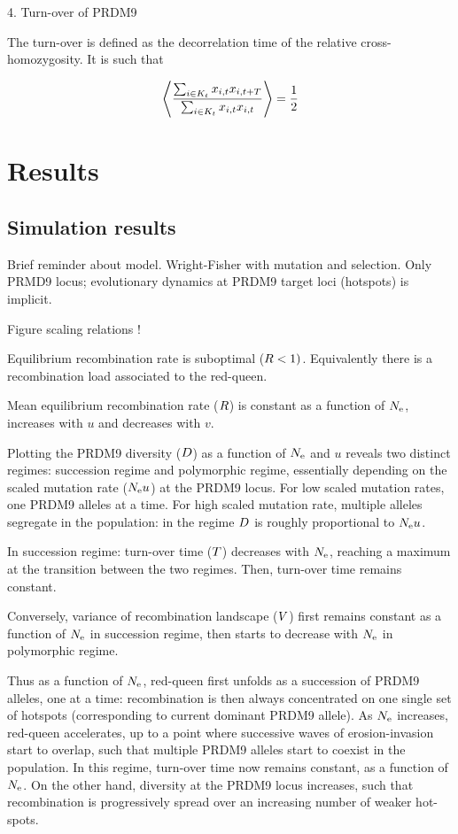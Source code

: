 \documentclass{article}
\begin{document}
4. Turn-over of PRDM9

The turn-over is defined as the decorrelation time of the relative cross-homozygosity.
It is such that 

\begin{align}
    \left< \dfrac{\sum_{i \in K_{t}} x_{i,t} x_{i,t+T}}{\sum_{i \in K_{t}} x_{i,t} x_{i,t}}   \right>  =  \dfrac{1}{2}
\end{align}

\section*{Results}
\subsection*{Simulation results} 

Brief reminder about model. Wright-Fisher with mutation and selection. Only PRMD9 locus; evolutionary dynamics at PRDM9 target loci (hotspots) is implicit.

Figure scaling relations !

Equilibrium recombination rate is suboptimal ($R < 1)$. Equivalently there is a recombination load associated to the red-queen.

Mean equilibrium recombination rate ($R$) is constant as a function of $N_\mathrm{e}$, increases with $u$ and decreases with $v$.

Plotting the PRDM9 diversity ($D$) as a function of $N_\mathrm{e}$ and $u$ reveals two distinct regimes: succession regime and polymorphic regime, essentially depending on the scaled mutation rate ($N_\mathrm{e} u$) at the PRDM9 locus. For low scaled mutation rates, one PRDM9 alleles at a time. For high scaled mutation rate, multiple alleles segregate in the population: in the regime $D$ is roughly proportional to $N_\mathrm{e} u$.

In succession regime: turn-over time ($T$) decreases with $N_\mathrm{e}$, reaching a maximum at the transition between the two regimes. Then, turn-over time remains constant.

Conversely, variance of recombination landscape ($V$) first remains constant as a function of $N_\mathrm{e}$ in succession regime, then starts to decrease with $N_\mathrm{e}$ in polymorphic regime.

Thus as a function of $N_\mathrm{e}$, red-queen first unfolds as a succession of PRDM9 alleles, one at a time: recombination is then always concentrated on one single set of hotspots (corresponding to current dominant PRDM9 allele). As $N_\mathrm{e}$ increases, red-queen accelerates, up to a point where successive waves of erosion-invasion start to overlap, such that multiple PRDM9 alleles start to coexist in the population. In this regime, turn-over time now remains constant, as a function of $N_\mathrm{e}$. On the other hand, diversity at the PRDM9 locus increases, such that recombination is progressively spread over an increasing number of weaker hot-spots.
\end{document}
